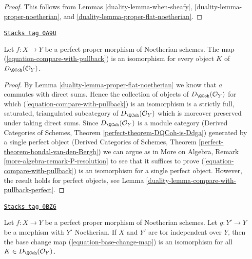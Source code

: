 \begin{proof}

This follows from Lemmas \ref{duality-lemma-when-sheafy},
\ref{duality-lemma-proper-noetherian}, and
\ref{duality-lemma-proper-flat-noetherian}.
\end{proof}

\begin{lemma}
\label{duality-lemma-compare-with-pullback-flat-proper-noetherian}
\href{https://stacks.math.columbia.edu/tag/0A9U}{\texttt{Stacks tag 0A9U}}

Let $f : X \to Y$ be a perfect proper morphism of Noetherian
schemes. The map (\ref{equation-compare-with-pullback}) is an isomorphism
for every object $K$ of $D_\QCoh(\mathcal{O}_Y)$.
\end{lemma}

\begin{proof}

By Lemma \ref{duality-lemma-proper-flat-noetherian} we know that $a$ commutes
with direct sums. Hence the collection of objects of
$D_\QCoh(\mathcal{O}_Y)$ for which (\ref{equation-compare-with-pullback})
is an isomorphism is a strictly full, saturated, triangulated
subcategory of $D_\QCoh(\mathcal{O}_Y)$ which is moreover
preserved under taking direct sums. Since $D_\QCoh(\mathcal{O}_Y)$
is a module category (Derived Categories of Schemes, Theorem
\ref{perfect-theorem-DQCoh-is-Ddga}) generated by a single
perfect object (Derived Categories of Schemes, Theorem
\ref{perfect-theorem-bondal-van-den-Bergh})
we can argue as in
More on Algebra, Remark \ref{more-algebra-remark-P-resolution}
to see that it suffices to prove (\ref{equation-compare-with-pullback})
is an isomorphism for a single perfect object.
However, the result holds for perfect objects, see
Lemma \ref{duality-lemma-compare-with-pullback-perfect}.
\end{proof}

\begin{lemma}
\label{duality-lemma-proper-perfect-base-change}
\href{https://stacks.math.columbia.edu/tag/0BZG}{\texttt{Stacks tag 0BZG}}

Let $f : X \to Y$ be a perfect proper morphism of Noetherian schemes.
Let $g : Y' \to Y$ be a morphism with $Y'$ Noetherian. If $X$ and
$Y'$ are tor independent over $Y$, then the base
change map (\ref{equation-base-change-map}) is an isomorphism
for all $K \in D_\QCoh(\mathcal{O}_Y)$.
\end{lemma}

